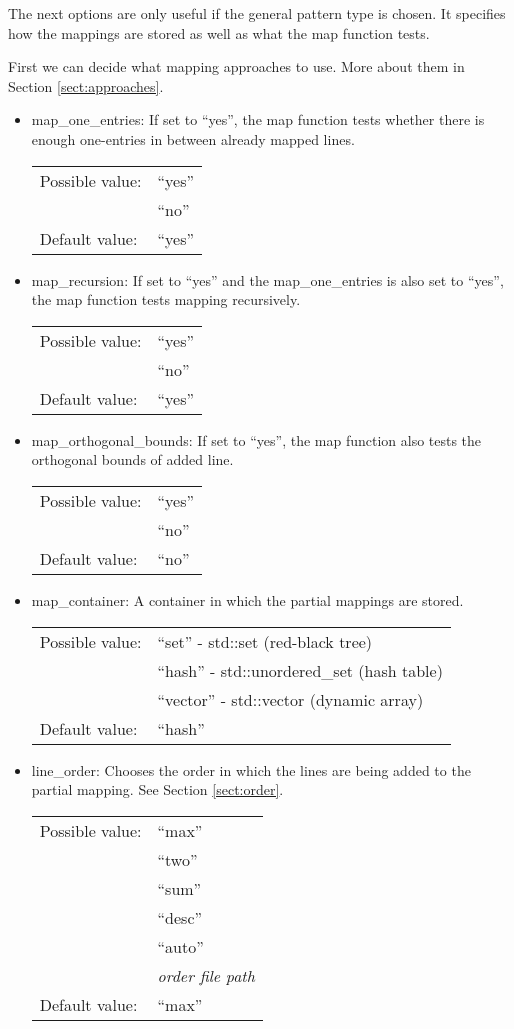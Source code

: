The next options are only useful if the general pattern type is chosen. It specifies how the mappings are stored as well as what the map function tests.

First we can decide what mapping approaches to use. More about them in Section \ref{sect:approaches}.
\begin{itemize}
\item map\_one\_entries: If set to ``yes'', the map function  tests whether there is enough one-entries in between already mapped lines.

\begin{tabular}{ll}
Possible value: & ``yes'' \\
& ``no'' \\
Default value: & ``yes''
\end{tabular}

\item map\_recursion: If set to ``yes'' and the map\_one\_entries is also set to ``yes'', the map function tests mapping recursively.

\begin{tabular}{ll}
Possible value: & ``yes'' \\
& ``no'' \\
Default value: & ``yes''
\end{tabular}

\item map\_orthogonal\_bounds: If set to ``yes'', the map function also tests the orthogonal bounds of added line.

\begin{tabular}{ll}
Possible value: & ``yes'' \\
& ``no'' \\
Default value: & ``no''
\end{tabular}
\end{itemize}

\begin{itemize}
\item map\_container: A container in which the partial mappings are stored.

\begin{tabular}{ll}
Possible value: & ``set'' - std::set (red-black tree) \\
& ``hash'' - std::unordered\_set (hash table) \\
& ``vector'' - std::vector (dynamic array) \\
Default value: & ``hash''
\end{tabular}

\item line\_order: Chooses the order in which the lines are being added to the partial mapping. See Section \ref{sect:order}.

\begin{tabular}{ll}
Possible value: & ``max'' \\
& ``two'' \\
& ``sum'' \\
& ``desc'' \\
& ``auto'' \\
& \textit{order file path} \\
Default value: & ``max''
\end{tabular}

\end{itemize}
